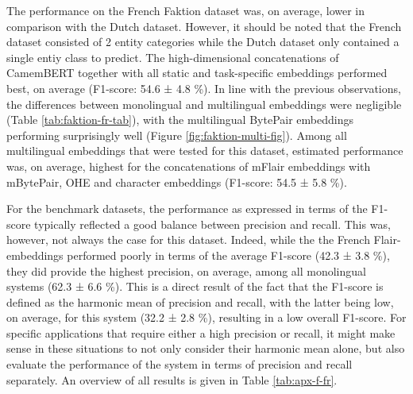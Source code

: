 \documentclass[12pt,a4paper,]{book}
\begin{document}
The performance on the French Faktion dataset was, on average, lower in comparison with the Dutch dataset. However, it should be noted that the French dataset consisted of 2 entity categories while the Dutch dataset only contained a single entiy class to predict. The high-dimensional concatenations of CamemBERT together with all static and task-specific embeddings performed best, on average (F1-score: 54.6 ± 4.8 \%). In line with the previous observations, the differences between monolingual and multilingual embeddings were negligible (Table \ref{tab:faktion-fr-tab}), with the multilingual BytePair embeddings performing surprisingly well (Figure \ref{fig:faktion-multi-fig}). Among all multilingual embeddings that were tested for this dataset, estimated performance was, on average, highest for the concatenations of mFlair embeddings with mBytePair, OHE and character embeddings (F1-score: 54.5 ± 5.8 \%).

For the benchmark datasets, the performance as expressed in terms of the F1-score typically reflected a good balance between precision and recall. This was, however, not always the case for this dataset. Indeed, while the the French Flair-embeddings performed poorly in terms of the average F1-score (42.3 ± 3.8 \%), they did provide the highest precision, on average, among all monolingual systems (62.3 ± 6.6 \%). This is a direct result of the fact that the F1-score is defined as the harmonic mean of precision and recall, with the latter being low, on average, for this system (32.2 ± 2.8 \%), resulting in a low overall F1-score. For specific applications that require either a high precision or recall, it might make sense in these situations to not only consider their harmonic mean alone, but also evaluate the performance of the system in terms of precision and recall separately. An overview of all results is given in Table \ref{tab:apx-f-fr}.
\end{document}
